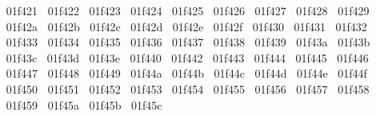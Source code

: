 {  ^^^^^^01f421%
  ^^^^^^01f422%
  ^^^^^^01f423%
  ^^^^^^01f424%
  ^^^^^^01f425%
  ^^^^^^01f426%
  ^^^^^^01f427%
  ^^^^^^01f428%
  ^^^^^^01f429%
  ^^^^^^01f42a%
  ^^^^^^01f42b%
  ^^^^^^01f42c%
  ^^^^^^01f42d%
  ^^^^^^01f42e%
  ^^^^^^01f42f%
  ^^^^^^01f430%
  ^^^^^^01f431%
  ^^^^^^01f432%
  ^^^^^^01f433%
  ^^^^^^01f434%
  ^^^^^^01f435%
  ^^^^^^01f436%
  ^^^^^^01f437%
  ^^^^^^01f438%
  ^^^^^^01f439%
  ^^^^^^01f43a%
  ^^^^^^01f43b%
  ^^^^^^01f43c%
  ^^^^^^01f43d%
  ^^^^^^01f43e%
  ^^^^^^01f440%
  ^^^^^^01f442%
  ^^^^^^01f443%
  ^^^^^^01f444%
  ^^^^^^01f445%
  ^^^^^^01f446%
  ^^^^^^01f447%
  ^^^^^^01f448%
  ^^^^^^01f449%
  ^^^^^^01f44a%
  ^^^^^^01f44b%
  ^^^^^^01f44c%
  ^^^^^^01f44d%
  ^^^^^^01f44e%
  ^^^^^^01f44f%
  ^^^^^^01f450%
  ^^^^^^01f451%
  ^^^^^^01f452%
  ^^^^^^01f453%
  ^^^^^^01f454%
  ^^^^^^01f455%
  ^^^^^^01f456%
  ^^^^^^01f457%
  ^^^^^^01f458%
  ^^^^^^01f459%
  ^^^^^^01f45a%
  ^^^^^^01f45b%
  ^^^^^^01f45c%
}
